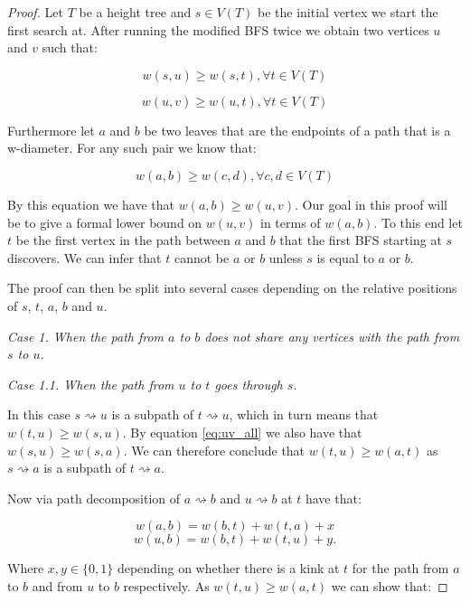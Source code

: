\begin{proof}
Let $T$ be a height tree and $s \in V(T)$ be the initial vertex we start the first search at. After running the modified BFS twice we obtain two vertices $u$ and $v$ such that:

\begin{equation}
    \label{eq:su_all}
    w(s, u) \ge w(s, t), \forall t \in V(T)
\end{equation}

\begin{equation}
    \label{eq:uv_all}
    w(u, v) \ge w(u, t), \forall t \in V(T)
\end{equation}

Furthermore let $a$ and $b$ be two leaves that are the endpoints of a path that is a w-diameter. For any such pair we know that:

\begin{equation}
    \label{eq:ab_all}
    w(a, b) \ge w(c, d), \forall c, d \in V(T)
\end{equation}

By this equation we have that $w(a, b) \ge w(u, v)$. Our goal in this proof will be to give a formal lower bound on $w(u, v)$ in terms of $w(a, b)$. To this end let $t$ be the first vertex in the path between $a$ and $b$ that the first BFS starting at $s$ discovers. We can infer that $t$ cannot be $a$ or $b$ unless $s$ is equal to $a$ or $b$.

The proof can then be split into several cases depending on the relative positions of $s$, $t$, $a$, $b$ and $u$. \linebreak

{\em Case 1. When the path from $a$ to $b$ does not share any vertices with the path from $s$ to $u$.}

{\em Case 1.1. When the path from $u$ to $t$ goes through $s$.}

In this case $s \rightsquigarrow u$ is a subpath of $t \rightsquigarrow u$, which in turn means that $w(t, u) \ge w(s, u)$. By equation \ref{eq:uv_all} we also have that $w(s, u) \ge w(s, a)$. We can therefore conclude that $w(t, u) \ge w(a, t)$ as $s \rightsquigarrow a$ is a subpath of $t \rightsquigarrow a$.

Now via path decomposition of $a \rightsquigarrow b$ and $u \rightsquigarrow b$ at $t$ have that:

$$ w(a, b) = w(b, t) + w(t, a) + x  $$
$$ w(u, b) = w(b, t) + w(t, u) + y .$$

Where $x, y \in \{0, 1\}$ depending on whether there is a kink at $t$ for the path from $a$ to $b$ and from $u$ to $b$ respectively. As $w(t, u) \ge w(a, t)$ we can show that:



\end{proof}
